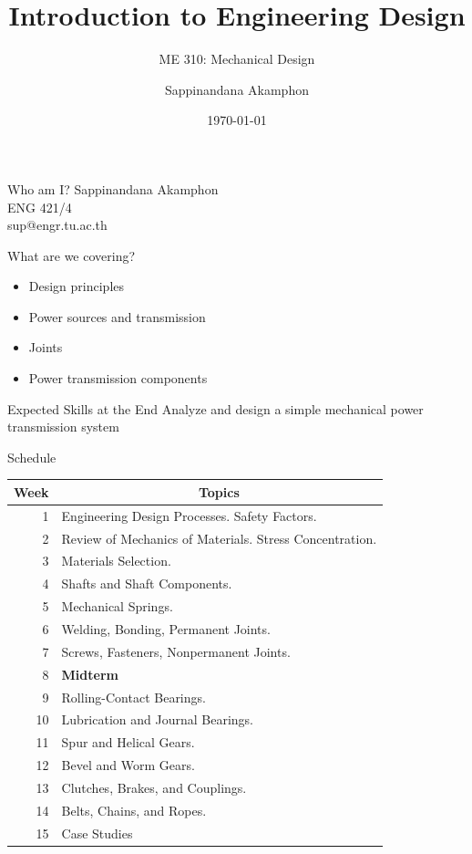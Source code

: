 \documentclass[10pt, svgnames]{beamer}
\author{Sappinandana Akamphon}
\date{\today}
\title{Introduction to Engineering Design}
\subtitle{ME 310: Mechanical Design}
\institute{Department of Mechanical Engineering, TSE}
\date{}
\begin{document}
\begin{frame}
\maketitle
\end{frame}

\begin{frame}[label={sec:orgf7890b3}]{Who am I?}
Sappinandana Akamphon \\\empty
ENG 421/4 \\\empty
sup@engr.tu.ac.th
\end{frame}

\begin{frame}[label={sec:orgfa8bff3}]{What are we covering?}
\begin{itemize}
\item Design principles
\item Power sources and transmission
\item Joints
\item Power transmission components
\end{itemize}
\end{frame}

\begin{frame}[label={sec:org99f5de2}]{Expected Skills at the End}
Analyze and design a simple mechanical power transmission system
\end{frame}

\begin{frame}[label={sec:orgc56ffbb}]{Schedule}
\small
\begin{center}
  \begin{tabular}{rl}
    \hline
    \toprule
    Week & \multicolumn{1}{c}{Topics} \\
    \midrule
    1 & Engineering Design Processes. Safety Factors. \\
    2 & Review of Mechanics of Materials. Stress Concentration. \\
    3 & Materials Selection. \\
    4 & Shafts and Shaft Components. \\
    5 & Mechanical Springs. \\
    6 & Welding, Bonding, Permanent Joints. \\
    7 & Screws, Fasteners, Nonpermanent Joints. \\
    8 & \textbf{Midterm} \\
    9 & Rolling-Contact Bearings. \\
    10 & Lubrication and Journal Bearings. \\
    11 & Spur and Helical Gears. \\
    12 & Bevel and Worm Gears. \\
    13 & Clutches, Brakes, and Couplings. \\
    14 & Belts, Chains, and Ropes. \\
    15 & Case Studies \\
    \bottomrule
  \end{tabular}
\end{center}
\end{frame}
\end{document}

